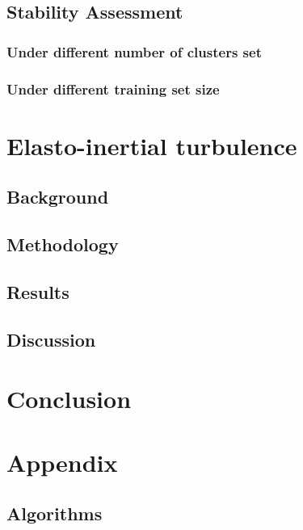 \documentclass[12pt]{report} %
\begin{document}
\section{Stability Assessment}

\subsection{Under different number of clusters set}

\subsection{Under different training set size}

\chapter{Elasto-inertial turbulence}

\section{Background}

\section{Methodology}

\section{Results}

\section{Discussion}

\chapter{Conclusion}


\chapter{Appendix}

\section{Algorithms}
\end{document}
